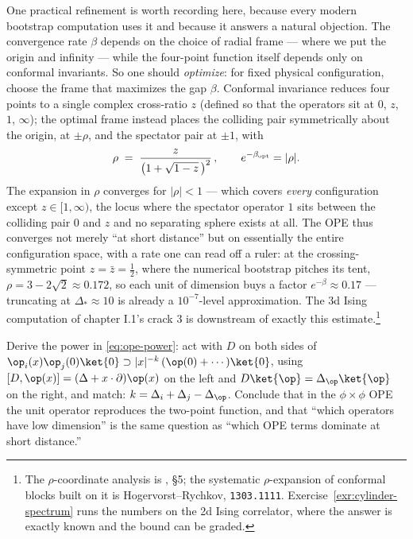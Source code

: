 One practical refinement is worth recording here, because every modern
bootstrap computation uses it and because it answers a natural objection.
The convergence rate $\beta$ depends on the choice
of radial frame --- where we put the origin and infinity --- while the
four-point function itself depends only on conformal invariants. So one
should \emph{optimize}: for fixed physical configuration, choose the frame
that maximizes the gap $\beta$. Conformal invariance reduces four points to a
single complex cross-ratio $z$ (defined so that the operators sit at $0$,
$z$, $1$, $\infty$); the optimal frame instead places the colliding pair
symmetrically about the origin, at $\pm\rho$, and the spectator pair at
$\pm 1$, with
\begin{equation}
\rho \;=\; \frac{z}{\big(1 + \sqrt{1 - z}\,\big)^2}\,,
\qquad
e^{-\beta_{\rm opt}} = |\rho| .
\label{eq:rho-coordinate}
\end{equation}
The expansion in $\rho$ converges for $|\rho| < 1$ --- which covers
\emph{every} configuration except $z \in [1, \infty)$, the locus where the
spectator operator $1$ sits between the colliding pair $0$ and $z$ and no
separating sphere exists at all. The OPE thus converges not merely ``at short
distance'' but on essentially the entire configuration space, with a rate one
can read off a ruler: at the crossing-symmetric point $z = \bar z = \frac12$,
where the numerical bootstrap pitches its tent, $\rho = 3 - 2\sqrt2 \approx
0.172$, so each unit of dimension buys a factor $e^{-\beta} \approx 0.17$ ---
truncating at $\Delta_* \approx 10$ is already a $10^{-7}$-level
approximation. The 3d Ising computation of chapter I.1's crack 3 is
downstream of exactly this estimate.\footnote{The $\rho$-coordinate analysis
is , \S5; the systematic $\rho$-expansion of conformal
blocks built on it is Hogervorst--Rychkov, \texttt{1303.1111}.
Exercise~\ref{exr:cylinder-spectrum} runs the numbers on the 2d Ising
correlator, where the answer is exactly known and the bound can be graded.}

\begin{exercise}[easy]
\label{exr:ope-power}
Derive the power in \eqref{eq:ope-power}: act with $D$ on both sides of
$\op_i(x)\op_j(0)\ket{0} \supset |x|^{-k}\,(\op(0) + \cdots)\ket{0}$, using
$[D, \op(x)] = (\Delta + x\cdot\partial)\op(x)$ on the left and
$D\ket{\op} = \Delta_\op\ket{\op}$ on the right, and match: $k = \Delta_i +
\Delta_j - \Delta_\op$. Conclude that in the $\phi\times\phi$ OPE the unit
operator reproduces the two-point function, and that ``which operators have
low dimension'' is the same question as ``which OPE terms dominate at short
distance.''
\end{exercise}

